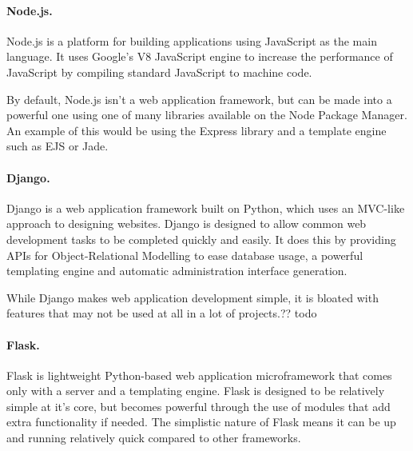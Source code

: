 \documentclass[a4paper, 12pt]{article}
\begin{document}
\paragraph{Node.js.}
Node.js is a platform for building applications using JavaScript as the main language. It uses Google's V8 JavaScript engine to increase the performance of JavaScript by compiling standard JavaScript to machine code.


By default, Node.js isn't a web application framework, but can be made into a powerful one using one of many libraries available on the Node Package Manager. An example of this would be using the Express library and a template engine such as EJS or Jade.



\paragraph{Django.}
Django is a web application framework built on Python, which uses an MVC-like approach to designing websites. Django is designed to allow common web development tasks to be completed quickly and easily. It does this by providing APIs for Object-Relational Modelling to ease database usage, a powerful templating engine and automatic administration interface generation.


While Django makes web application development simple, it is bloated with features that may not be used at all in a lot of projects.?? todo

\paragraph{Flask.}
Flask is lightweight Python-based web application microframework that comes only with a server and a templating engine. Flask is designed to be relatively simple at it's core, but becomes powerful through the use of modules that add extra functionality if needed. The simplistic nature of Flask means it can be up and running relatively quick compared to other frameworks.

\end{document}
